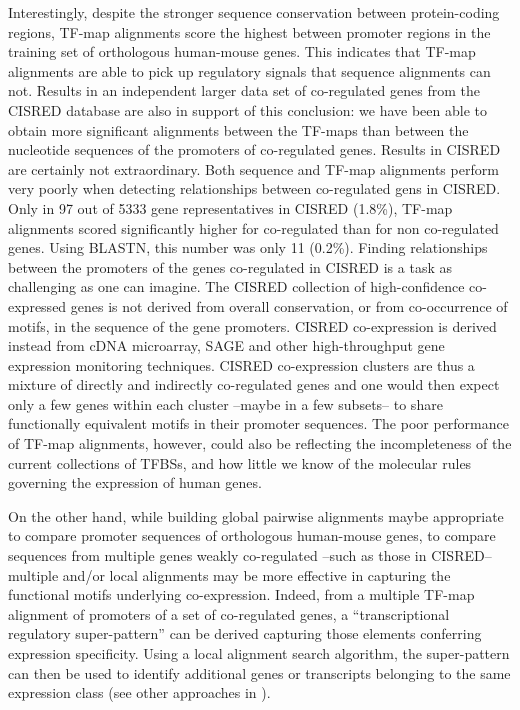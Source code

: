 Interestingly, despite the stronger sequence conservation between
protein-coding regions, TF-map alignments score the highest between promoter
regions in the training set of orthologous human-mouse genes. 
This indicates that TF-map alignments are able to pick up regulatory
signals that sequence alignments can not. Results in an independent
larger data set of co-regulated genes from the CISRED database are
also in support of this conclusion: we have been able to obtain more
significant alignments between the TF-maps than between the nucleotide
sequences of the promoters of co-regulated genes. Results in CISRED are
certainly not extraordinary. Both sequence and TF-map alignments
perform very poorly when detecting relationships between co-regulated
gens in CISRED. Only in 97 out of 5333 gene representatives in CISRED
(1.8\%), TF-map alignments scored significantly higher for co-regulated 
than for non co-regulated genes. Using BLASTN, this number was only 11
(0.2\%). Finding relationships between the promoters of the genes
co-regulated in CISRED is a task as challenging as one can
imagine. The CISRED collection of high-confidence co-expressed genes
is not derived from overall conservation, or from co-occurrence of motifs, 
in the sequence of the gene promoters. CISRED co-expression is derived 
instead from cDNA microarray, SAGE and other high-throughput gene expression 
monitoring techniques. CISRED co-expression clusters are thus a mixture of directly
and indirectly co-regulated genes and one would then expect only a few
genes within each cluster --maybe in a few subsets-- to share
functionally equivalent motifs in their promoter sequences. The poor
performance of TF-map alignments, however, could also be reflecting the
incompleteness of the current collections of TFBSs, and how little we
know of the molecular rules governing the expression of human genes. 

On the other hand, while building global pairwise alignments maybe
appropriate to compare promoter sequences of orthologous human-mouse
genes, to compare sequences from multiple genes weakly
co-regulated --such as those in CISRED-- multiple and/or local alignments
may be more effective in capturing the functional motifs underlying
co-expression. Indeed, from a multiple TF-map alignment of promoters
of a set of co-regulated genes, a ``transcriptional regulatory
super-pattern'' 
can be derived capturing those elements conferring
expression specificity. Using a local alignment search algorithm, the
super-pattern can then be used to identify additional genes or
transcripts belonging to the same expression class (see other approaches
in \citep{knight:1995a}). 

